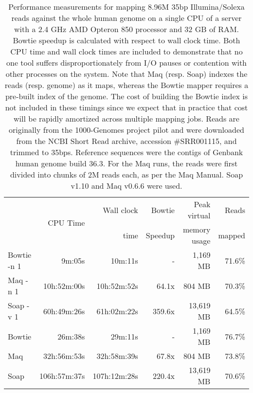 \documentclass[letterpaper]{article}
\begin{document}
\begin{table}[tp]
\scriptsize
\begin{tabular}{lrrrrr}
\toprule
 & \multirow{2}{*}{CPU Time} & Wall clock & Bowtie  & Peak virtual & Reads  \\
 &                            & time       & Speedup & memory usage & mapped \\[3pt]
\toprule
Bowtie -n 1 & 9m:05s & 10m:11s & - & 1,169 MB & 71.6\%\\\midrule
Maq -n 1 & 10h:52m:00s & 10h:52m:52s & 64.1x & 804 MB & 70.3\%\\\midrule
Soap -v 1 & 60h:49m:26s & 61h:02m:22s & 359.6x & 13,619 MB & 64.5\%\\\midrule
\midrule
Bowtie & 26m:38s & 29m:11s & - & 1,169 MB & 76.7\%\\\midrule
Maq & 32h:56m:53s & 32h:58m:39s & 67.8x & 804 MB & 73.8\%\\\midrule
Soap & 106h:57m:37s & 107h:12m:28s & 220.4x & 13,619 MB & 70.6\%\\
\bottomrule
\end{tabular}
\caption{Performance measurements for mapping 8.96M 35bp Illumina/Solexa reads against the whole human genome on a single CPU of a server with a 2.4 GHz AMD Opteron 850 processor and 32 GB of RAM. Bowtie speedup is calculated with respect to wall clock time. Both CPU time and wall clock times are included to demonstrate that no one tool suffers disproportionately from I/O pauses or contention with other processes on the system. Note that Maq (resp. Soap) indexes the reads (resp. genome) as it maps, whereas the Bowtie mapper requires a pre-built index of the genome.  The cost of building the Bowtie index is not included in these timings since we expect that in practice that cost will be rapidly amortized across multiple mapping jobs. Reads are originally from the 1000-Genomes project pilot and were downloaded from the NCBI Short Read archive, accession \#SRR001115, and trimmed to 35bps. Reference sequences were the contigs of Genbank human genome build 36.3. For the Maq runs, the reads were first divided into chunks of 2M reads each, as per the Maq Manual. Soap v1.10 and Maq v0.6.6 were used. }
\end{table}
\end{document}
